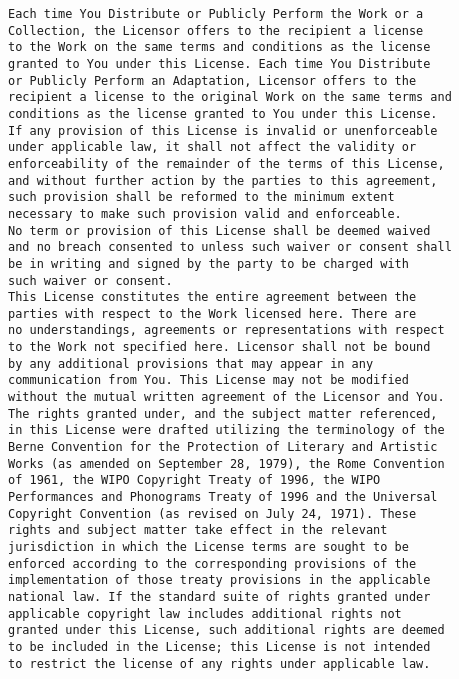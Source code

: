 \begin{verbatim}
Each time You Distribute or Publicly Perform the Work or a
Collection, the Licensor offers to the recipient a license
to the Work on the same terms and conditions as the license
granted to You under this License. Each time You Distribute
or Publicly Perform an Adaptation, Licensor offers to the
recipient a license to the original Work on the same terms and
conditions as the license granted to You under this License.
If any provision of this License is invalid or unenforceable
under applicable law, it shall not affect the validity or
enforceability of the remainder of the terms of this License,
and without further action by the parties to this agreement,
such provision shall be reformed to the minimum extent
necessary to make such provision valid and enforceable.
No term or provision of this License shall be deemed waived
and no breach consented to unless such waiver or consent shall
be in writing and signed by the party to be charged with
such waiver or consent.
This License constitutes the entire agreement between the
parties with respect to the Work licensed here. There are
no understandings, agreements or representations with respect
to the Work not specified here. Licensor shall not be bound
by any additional provisions that may appear in any
communication from You. This License may not be modified
without the mutual written agreement of the Licensor and You.
The rights granted under, and the subject matter referenced,
in this License were drafted utilizing the terminology of the
Berne Convention for the Protection of Literary and Artistic
Works (as amended on September 28, 1979), the Rome Convention
of 1961, the WIPO Copyright Treaty of 1996, the WIPO
Performances and Phonograms Treaty of 1996 and the Universal
Copyright Convention (as revised on July 24, 1971). These
rights and subject matter take effect in the relevant
jurisdiction in which the License terms are sought to be
enforced according to the corresponding provisions of the
implementation of those treaty provisions in the applicable
national law. If the standard suite of rights granted under
applicable copyright law includes additional rights not
granted under this License, such additional rights are deemed
to be included in the License; this License is not intended
to restrict the license of any rights under applicable law.

\end{verbatim}


